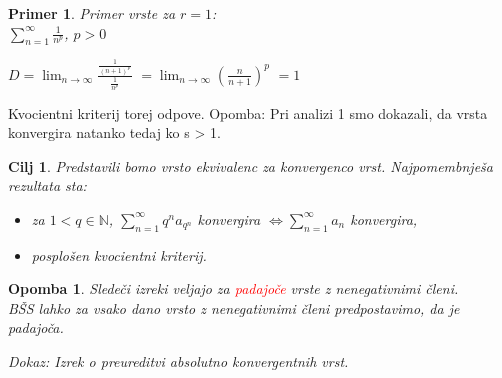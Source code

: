\documentclass{beamer}
\newtheorem{cilj}{Cilj}
\newtheorem{opomba}{Opomba}
\newtheorem{primer}{Primer}
\begin{document}
\begin{frame}
    \begin{primer}{Primer vrste za $r = 1$}: \\
       $\sum_{n = 1}^{\infty}{\frac{1}{n^p}}$, $p > 0$
    \end{primer}
    
    \vspace{\baselineskip}
    \pause
    $D = \lim_{n \to \infty} \frac{\frac{1}{(n+1)^p}}{\frac{1}{n^p}}$
    $= \lim_{n \to \infty} (\frac{n}{n + 1})^p$ 
    $= 1$
    
    \vspace{\baselineskip}
    Kvocientni kriterij torej odpove.
    Opomba: Pri analizi 1 smo dokazali, da vrsta konvergira natanko tedaj ko s > 1.
\end{frame}
\begin{frame}
    \begin{cilj}
        Predstavili bomo vrsto ekvivalenc za konvergenco vrst. Najpomembnješa rezultata sta:
        \begin{itemize}
            \item za $ 1 < q \in {\mathbb{N}}$, $\sum_{n = 1}^{\infty}{q^na_{q^n}}$ konvergira $\iff \sum_{n = 1}^{\infty}{a_{n}}$ konvergira, \\
            \item posplošen kvocientni kriterij.
        \end{itemize} 
    \end{cilj}

    \pause
    \vspace{\baselineskip}

    
    \begin{opomba}
        Sledeči izreki veljajo za \textcolor{red}{padajoče} vrste z nenegativnimi členi.\\
        BŠS lahko za vsako dano vrsto z nenegativnimi členi predpostavimo, da je padajoča.

        \vspace{\baselineskip}
        Dokaz: Izrek o preureditvi absolutno konvergentnih vrst.
    \end{opomba}
\end{frame}
\end{document}
